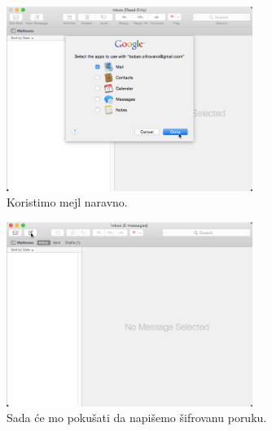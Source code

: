 \documentclass[a4paper,11pt]{article}
\begin{document}
\begin{figure}[!h]
	\begin{center}
		\includegraphics[width=8cm]{14_Oracle_VM_VirtualBox.png}
		\caption{Koristimo mejl naravno.}
		\label{gpgtools_email_setup4}
	\end{center}
\end{figure}
\newpage
\begin{figure}[!h]
	\begin{center}
		\includegraphics[width=8cm]{15_Oracle_VM_VirtualBox.png}
		\caption{Sada \'{c}e mo poku\v{s}ati da napi\v{s}emo \v{s}ifrovanu poruku.}
		\label{gpgtools_email_setup5}
	\end{center}
\end{figure}
\end{document}
